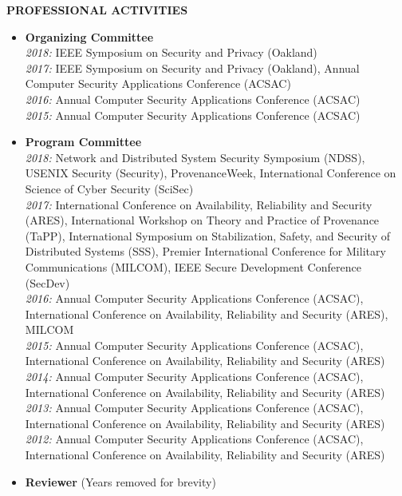 \documentclass[10pt]{article}
\begin{document}
\vspace{1em} {\Large \textbf{PROFESSIONAL ACTIVITIES}}
\begin{itemize}
  \item \textbf{Organizing Committee}\\
    \textit{2018:} IEEE Symposium on Security and Privacy (Oakland)\\
    \textit{2017:} IEEE Symposium on Security and Privacy (Oakland), Annual Computer Security Applications Conference (ACSAC)\\
    \textit{2016:} Annual Computer Security Applications Conference (ACSAC)\\
    \textit{2015:} Annual Computer Security Applications Conference (ACSAC)
  \item \textbf{Program Committee}\\
    \textit{2018:} Network and Distributed System Security Symposium (NDSS), USENIX Security (Security), ProvenanceWeek, International Conference on Science of Cyber Security (SciSec)\\
    \textit{2017:} International Conference on Availability, Reliability and Security (ARES), International Workshop on Theory and Practice of Provenance (TaPP), International Symposium on Stabilization, Safety, and Security of Distributed Systems (SSS), Premier International Conference for Military Communications (MILCOM), IEEE Secure Development Conference (SecDev)\\
    \textit{2016:} Annual Computer Security Applications Conference (ACSAC), International Conference on Availability, Reliability and Security (ARES), MILCOM\\
    \textit{2015:} Annual Computer Security Applications Conference (ACSAC), International Conference on Availability, Reliability and Security (ARES)\\
    \textit{2014:} Annual Computer Security Applications Conference (ACSAC), International Conference on Availability, Reliability and Security (ARES)\\
    \textit{2013:} Annual Computer Security Applications Conference (ACSAC), International Conference on Availability, Reliability and Security (ARES)\\
    \textit{2012:} Annual Computer Security Applications Conference (ACSAC), International Conference on Availability, Reliability and Security (ARES)\\
  \item \textbf{Reviewer} (Years removed for brevity)\\

\end{itemize}
\end{document}
